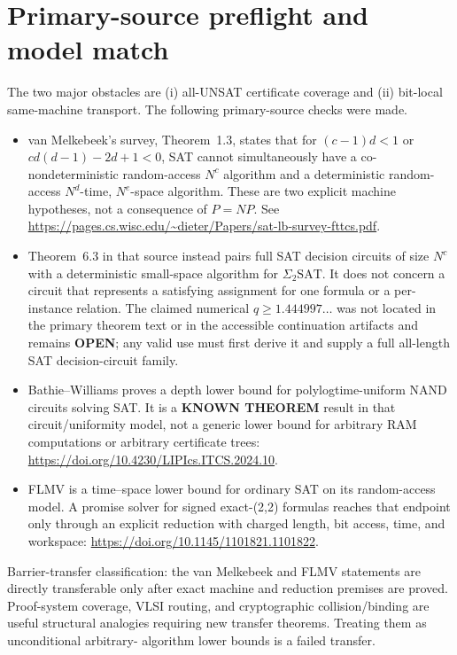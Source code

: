 \documentclass[11pt]{article}
\newcommand{\known}{\textbf{KNOWN THEOREM}}
\newcommand{\openstatus}{\textbf{OPEN}}
\begin{document}
\section*{Primary-source preflight and model match}
The two major obstacles are (i) all-UNSAT certificate coverage and (ii) bit-local
same-machine transport.  The following primary-source checks were made.
\begin{itemize}[leftmargin=*]
\item van Melkebeek's survey, Theorem~1.3, states that for
$ (c-1)d<1$ or $cd(d-1)-2d+1<0$, SAT cannot simultaneously have a
co-nondeterministic random-access $N^c$ algorithm and a deterministic random-access
$N^d$-time, $N^e$-space algorithm.  These are two explicit machine hypotheses, not a
consequence of $P=NP$.  See
\url{https://pages.cs.wisc.edu/~dieter/Papers/sat-lb-survey-fttcs.pdf}.
\item Theorem~6.3 in that source instead pairs full SAT decision circuits of size
$N^c$ with a deterministic small-space algorithm for $\Sigma_2\mathrm{SAT}$.  It does
not concern a circuit that represents a satisfying assignment for one formula or a
per-instance relation.  The claimed numerical $q\ge1.444997\ldots$ was not located in
the primary theorem text or in the accessible continuation artifacts and remains
\openstatus; any valid use must first derive it and supply a full all-length SAT
decision-circuit family.
\item Bathie--Williams proves a depth lower bound for polylogtime-uniform NAND circuits
solving SAT.  It is a \known{} result in that circuit/uniformity model, not a generic
lower bound for arbitrary RAM computations or arbitrary certificate trees:
\url{https://doi.org/10.4230/LIPIcs.ITCS.2024.10}.
\item FLMV is a time--space lower bound for ordinary SAT on its random-access model.
A promise solver for signed exact-(2,2) formulas reaches that endpoint only through an
explicit reduction with charged length, bit access, time, and workspace:
\url{https://doi.org/10.1145/1101821.1101822}.
\end{itemize}

Barrier-transfer classification: the van Melkebeek and FLMV statements are directly
transferable only after exact machine and reduction premises are proved.  Proof-system
coverage, VLSI routing, and cryptographic collision/binding are useful structural
analogies requiring new transfer theorems.  Treating them as unconditional arbitrary-
algorithm lower bounds is a failed transfer.
\end{document}
